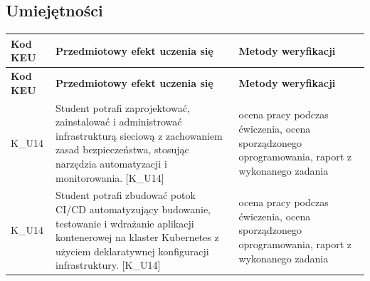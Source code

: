 \documentclass[12pt, a4paper]{article}
\newcommand{\thdrule}{\noalign{\global\setlength{\extrarowheight}{0pt}}}
\newcommand{\thdend}{\noalign{\global\setlength{\extrarowheight}{3pt}}}
\begin{document}
\subsection*{Umiejętności}
{\scriptsize
\begin{longtable}{m{1.6cm}m{9.0cm}m{4.2cm}}
\thdrule\toprule
\rowcolor{pjatkRed} {\color{white}\footnotesize\textbf{\vphantom{Ag}Kod KEU}} & {\color{white}\footnotesize\textbf{\vphantom{Ag}Przedmiotowy efekt uczenia się}} & {\color{white}\footnotesize\textbf{\vphantom{Ag}Metody weryfikacji}} \\
\midrule\thdend
\endfirsthead
\thdrule\toprule
\rowcolor{pjatkRed} {\color{white}\footnotesize\textbf{\vphantom{Ag}Kod KEU}} & {\color{white}\footnotesize\textbf{\vphantom{Ag}Przedmiotowy efekt uczenia się}} & {\color{white}\footnotesize\textbf{\vphantom{Ag}Metody weryfikacji}} \\
\midrule\thdend
\endhead
  \rowcolor{tableRowLight} K\_U14 & Student potrafi zaprojektować, zainstalować i administrować infrastrukturą sieciową z zachowaniem zasad bezpieczeństwa, stosując narzędzia automatyzacji i monitorowania. {[}K\_U14{]} & ocena pracy podczas ćwiczenia, ocena sporządzonego oprogramowania, raport z wykonanego zadania \\
  \rowcolor{tableRowAlt} K\_U14 & Student potrafi zbudować potok CI/CD automatyzujący budowanie, testowanie i wdrażanie aplikacji kontenerowej na klaster Kubernetes z użyciem deklaratywnej konfiguracji infrastruktury. {[}K\_U14{]} & ocena pracy podczas ćwiczenia, ocena sporządzonego oprogramowania, raport z wykonanego zadania \\
\bottomrule
\end{longtable}}
\end{document}
